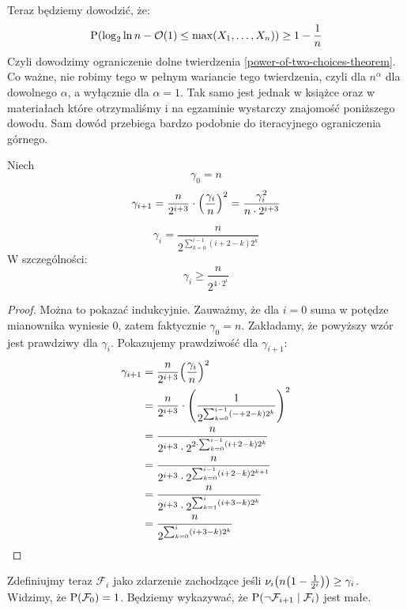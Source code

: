 Teraz będziemy dowodzić, że:
\[
	\prob\pars{\log_2\ln n - \mathcal{O}(1) \leq \max(X_1, \ldots, X_n)} \geq 1 - \frac{1}{n}
\]
Czyli dowodzimy ograniczenie dolne twierdzenia \ref{power-of-two-choices-theorem}. Co ważne, nie robimy tego w pełnym wariancie tego twierdzenia, czyli dla \(n^\alpha\) dla dowolnego \(\alpha\), a wyłącznie dla \(\alpha = 1\). Tak samo jest jednak w książce oraz w materiałach które otrzymaliśmy i na egzaminie wystarczy znajomość poniższego dowodu. Sam dowód przebiega bardzo podobnie do iteracyjnego ograniczenia górnego.

Niech
\[
	\gamma_0 = n
\]
\[
	\gamma_{i+1} = \frac{n}{2^{i+3}} \cdot \left(\frac{\gamma_i}{n}\right)^2 = \frac{\gamma_i^2}{n \cdot 2^{i+3}}
\]
\begin{lemma}
	\label{two-choices-lowerbound-gamma-lemma}
	\[
		\gamma_i = \frac{n}{2^{\sum_{k = 0}^{i-1}(i + 2 - k)2^k}}
	\]
	W szczególności:
	\[
		\gamma_i \geq \frac{n}{2^{4 \cdot 2^i}}
	\]
\end{lemma}
\begin{proof}
	Można to pokazać indukcyjnie. Zauważmy, że dla \( i = 0 \) suma w potędze mianownika wyniesie 0, zatem faktycznie \( \gamma_0 = n \).
	Zakładamy, że powyższy wzór jest prawdziwy dla \( \gamma_i \). Pokazujemy prawdziwość dla \( \gamma_{i+1} \):
	\begin{align*}
		\gamma_{i+1} & = \frac{n}{2^{i+3}} \pars{\frac{\gamma_i}{n}}^2                                     \\
		             & = \frac{n}{2^{i+3}} \cdot \pars{\frac{1}{2^{\sum_{k = 0}^{i - 1}(- + 2 - k)2^k}}}^2 \\
		             & = \frac{n}{2^{i+3} \cdot 2^{2 \cdot \sum_{k = 0}^{i - 1}(i + 2 - k)2^k}}            \\
		             & = \frac{n}{2^{i+3} \cdot 2^{\sum_{k = 0}^{i - 1}(i + 2 - k)2^{k+1}}}                \\
		             & = \frac{n}{2^{i+3} \cdot 2^{\sum_{k = 1}^{i}(i + 3 - k)2^k}}                        \\
		             & = \frac{n}{2^{\sum_{k = 0}^i(i + 3 - k)2^k}}
	\end{align*}
\end{proof}

Zdefiniujmy teraz \( \mathcal{F}_i \) jako zdarzenie zachodzące jeśli \( \nu_i\pars{n\pars{1 - \frac{1}{2^i}}} \geq \gamma_i \). Widzimy, że \( \prob\pars{\mathcal{F}_0} = 1 \).
Będziemy wykazywać, że \( \prob\pars{\neg\mathcal{F}_{i+1} \mid \mathcal{F}_i} \) jest małe.

